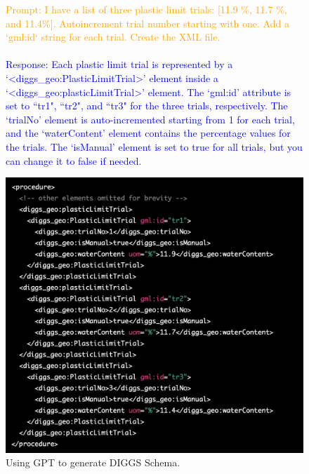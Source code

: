 \documentclass{article}
\begin{document}
\begin{figure}[ht]
    \begin{minipage}{0.48\textwidth}
    \textcolor{orange}{Prompt: I have a list of three plastic limit trials: [11.9 \%, 11.7 \%, and 11.4\%]. Autoincrement trial number starting with one. Add a `gml:id` string for each trial. Create the XML file. }
    \\\\
    \textcolor{blue}{Response: Each plastic limit trial is represented by a `\textless diggs\_geo:PlasticLimitTrial\textgreater' element inside a `\textless diggs\_geo:plasticLimitTrial\textgreater' element. The `gml:id' attribute is set to ``tr1", ``tr2", and ``tr3" for the three trials, respectively. The `trialNo' element is auto-incremented starting from 1 for each trial, and the `waterContent' element contains the percentage values for the trials. The `isManual' element is set to true for all trials, but you can change it to false if needed.}
    \end{minipage}%
    \hspace{0.5cm}%
    \begin{minipage}[r]{0.45\textwidth}
    \includegraphics[width = \linewidth]{figs/diggs.png}
    \end{minipage}
    \caption{Using GPT to generate DIGGS Schema.}
    \label{fig:diggs}
\end{figure}
\end{document}
